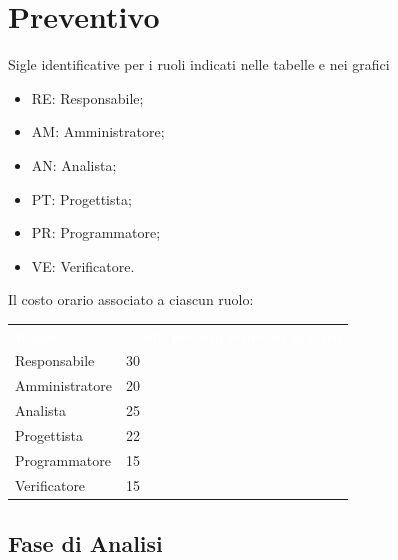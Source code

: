 \section{Preventivo}
Sigle identificative per i ruoli indicati nelle tabelle e nei grafici
\begin{itemize}
    \item RE: Responsabile;
    \item AM: Amministratore;
    \item AN: Analista;
    \item PT: Progettista;
    \item PR: Programmatore;
    \item VE: Verificatore.
\end{itemize}
Il costo orario associato a ciascun ruolo:

{
	\renewcommand{\arraystretch}{2}
	\centering
	\begin{longtable}{ C{2cm} C{3cm}}
		\textcolor{white}{\textbf{Ruolo}} & \textcolor{white}{\textbf{Costo per ora espresso in euro}}\\	
        
        Responsabile & 30\\
        Amministratore & 20\\
        Analista & 25\\
        Progettista & 22\\
        Programmatore & 15\\
        Verificatore & 15\\
		
	\end{longtable}
}

\subsection{Fase di Analisi}

